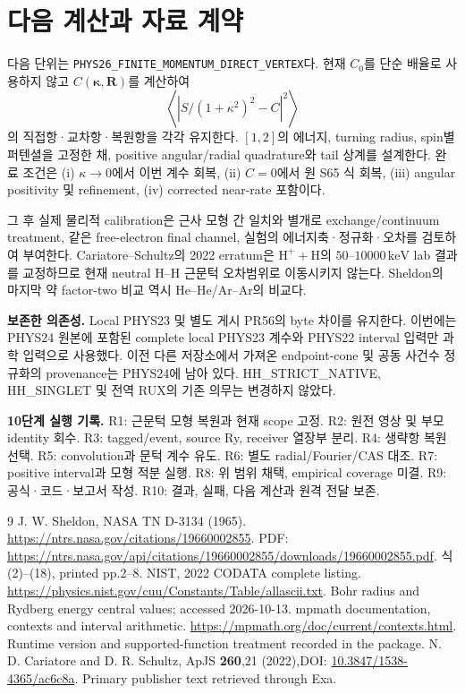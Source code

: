 \documentclass[11pt,a4paper]{article}
\numberwithin{equation}{section}
\begin{document}
\newpage
\section{다음 계산과 자료 계약}
다음 단위는 \texttt{PHYS26\_FINITE\_MOMENTUM\_DIRECT\_VERTEX}다. 현재 $C_0$를 단순 배율로 사용하지 않고 $C(\bm\kappa,\bm R)$를 계산하여
\[
\left\langle|S/(1+\kappa^2)^2-C|^2\right\rangle
\]
의 직접항·교차항·복원항을 각각 유지한다. $[1,2]$의 에너지, turning radius, spin별 퍼텐셜을 고정한 채, positive angular/radial quadrature와 tail 상계를 설계한다. 완료 조건은 (i) $\kappa\to0$에서 이번 계수 회복, (ii) $C=0$에서 원 S65 식 회복, (iii) angular positivity 및 refinement, (iv) corrected near-rate 포함이다.

그 후 실제 물리적 calibration은 근사 모형 간 일치와 별개로 exchange/continuum treatment, 같은 free-electron final channel, 실험의 에너지축·정규화·오차를 검토하여 부여한다. Cariatore--Schultz의 2022 erratum은 $\mathrm H^++\mathrm H$의 $50$--$10000\,\mathrm{keV}$ lab 결과를 교정하므로 현재 neutral H--H 근문턱 오차범위로 이동시키지 않는다\cite{erratum}. Sheldon의 마지막 약 factor-two 비교 역시 He--He/Ar--Ar의 비교다\cite{sheldon}.

\textbf{보존한 의존성.} Local PHYS23 및 별도 게시 PR56의 byte 차이를 유지한다. 이번에는 PHYS24 원본에 포함된 complete local PHYS23 계수와 PHYS22 interval 입력만 과학 입력으로 사용했다. 이전 다른 저장소에서 가져온 endpoint-cone 및 공동 사건수 정규화의 provenance는 PHYS24에 남아 있다. HH\_STRICT\_NATIVE, HH\_SINGLET 및 전역 RUX의 기존 의무는 변경하지 않았다.

\textbf{10단계 실행 기록.} R1: 근문턱 모형 복원과 현재 scope 고정. R2: 원전 영상 및 부모 identity 회수. R3: tagged/event, source Ry, receiver 열장부 분리. R4: 생략항 복원 선택. R5: convolution과 문턱 계수 유도. R6: 별도 radial/Fourier/CAS 대조. R7: positive interval과 모형 적분 실행. R8: 위 범위 채택, empirical coverage 미결. R9: 공식·코드·보고서 작성. R10: 결과, 실패, 다음 계산과 원격 전달 보존.

\begin{thebibliography}{9}\small
{} J. W. Sheldon, NASA TN D-3134 (1965).\newline
\url{https://ntrs.nasa.gov/citations/19660002855}. PDF: \url{https://ntrs.nasa.gov/api/citations/19660002855/downloads/19660002855.pdf}. 식(2)--(18), printed pp.2--8.
 NIST, 2022 CODATA complete listing.\newline
\url{https://physics.nist.gov/cuu/Constants/Table/allascii.txt}. Bohr radius and Rydberg energy central values; accessed 2026-10-13.
 mpmath documentation, contexts and interval arithmetic.\newline
\url{https://mpmath.org/doc/current/contexts.html}. Runtime version and supported-function treatment recorded in the package.
 N. D. Cariatore and D. R. Schultz, ApJS \textbf{260},21 (2022),\newline DOI: \href{https://doi.org/10.3847/1538-4365/ac6c8a}{10.3847/1538-4365/ac6c8a}. Primary publisher text retrieved through Exa.
\end{thebibliography}
\end{document}

